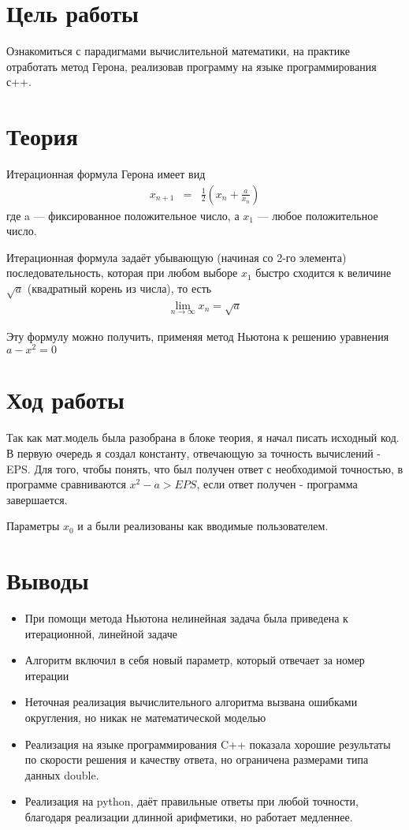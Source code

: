\section{Цель работы}
Ознакомиться с парадигмами вычислительной математики, на практике отработать метод Герона, реализовав программу на языке программирования с++.
\section{Теория}

Итерационная формула Герона имеет вид
\begin{eqnarray}
 x_{n+1} &=& \frac{1}{2} \left(x_{n} + \frac{a}{x_{n}}\right)
\end{eqnarray}
где a — фиксированное положительное число, а $ x_{1} $ — любое положительное число.

Итерационная формула задаёт убывающую (начиная со 2-го элемента) последовательность, которая при любом выборе $ x_{1} $ быстро сходится к величине $ \sqrt{a} $ (квадратный корень из числа), то есть 
\begin{eqnarray}
	\lim _{n\rightarrow \infty } x_{n}={\sqrt {a}}
\end{eqnarray}

Эту формулу можно получить, применяя метод Ньютона к решению уравнения $ a-x^{2}=0 $
\section{Ход работы}
Так как мат.модель была разобрана в блоке теория, я начал писать исходный код. В первую очередь я создал константу, отвечающую за точность вычислений - EPS. Для того, чтобы понять, что был получен ответ с необходимой точностью, в программе сравниваются $ x^2 - a > EPS $, если ответ получен - программа завершается.

Параметры $ x_{0} $ и а были реализованы как вводимые пользователем.





\section{Выводы}
\begin{itemize}
	\item При помощи метода Ньютона нелинейная задача была приведена к итерационной, линейной задаче
	\item Алгоритм включил в себя новый параметр, который отвечает за номер итерации
	\item Неточная реализация вычислительного алгоритма вызвана ошибками округления, но никак не математической моделью
	\item Реализация на языке программирования C++ показала хорошие результаты по скорости решения и качеству ответа, но ограничена размерами типа данных double.
	\item Реализация на python, даёт правильные ответы при любой точности, благодаря реализации длинной арифметики, но работает медленнее.
\end{itemize}